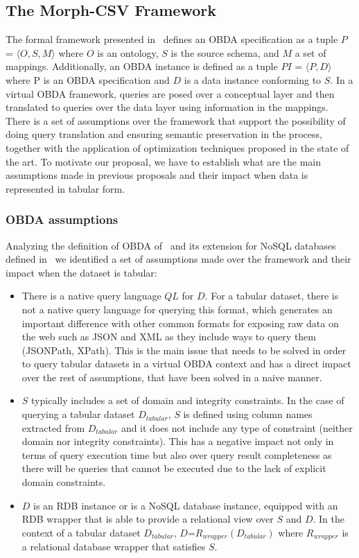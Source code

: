 \subsection{The Morph-CSV Framework}
The formal framework presented in~\citep{xiao2018obdasurvey} defines an OBDA specification as a tuple $P$ = $\langle O,S,M\rangle$ where $O$ is an ontology, $S$ is the source schema, and $M$ a set of mappings. Additionally, an OBDA instance is defined as a tuple $PI$ = $\langle P,D\rangle$ where P is an OBDA specification and $D$ is a data instance conforming to $S$. In a virtual OBDA framework, queries are posed over a conceptual layer and then translated to queries over the data layer using information in the mappings. There is a set of assumptions over the framework that support the possibility of doing query translation and  ensuring  semantic preservation in the process, together with the application of  optimization techniques proposed in the state of the art. To motivate our proposal, we have to establish what are the main assumptions made in previous proposals and their impact when data is represented in tabular form.
\subsubsection{OBDA assumptions}
Analyzing the definition of OBDA of~\citep{xiao2018obdasurvey} and its extension for NoSQL databases defined in~\citep{botoeva2019ontology} we identified a set of assumptions made over the framework and their impact when the dataset is tabular:
\begin{itemize}
    \item There is a native query language $QL$ for $D$. For a tabular dataset, there is not a native query language for querying this format, which generates an important difference with other common formats for exposing raw data on the web such as JSON and XML as they include ways to query them (JSONPath, XPath). This is the main issue that needs to be solved in order to query tabular datasets in a virtual OBDA context and has a direct impact over the rest of assumptions, that have been solved in a naive manner.
    \item $S$ typically includes a set of domain and integrity constraints. In the case of querying a tabular dataset $D_{tabular}$, $S$ is defined using column names extracted from $D_{tabular}$ and it does not include any type of constraint (neither domain nor integrity constraints). This has a negative impact not only in terms of query execution time but also over query result completeness as there will be queries that cannot be executed due to the lack of explicit domain constraints.
    \item $D$ is an RDB instance or is a NoSQL database instance, equipped with an RDB wrapper that is able to provide a relational view over $S$ and $D$. In the context of a tabular dataset $D_{tabular}$, $D$=$R_{wrapper}(D_{tabular})$ where $R_{wrapper}$ is a relational database wrapper that satisfies $S$.
\end{itemize}

